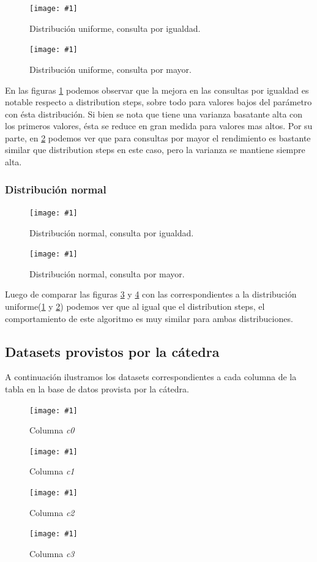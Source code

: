 \documentclass[a4paper, 10pt, twoside]{article}
\newcommand{\grafico}[3]{
  \begin{figure}[H]
    \texttt{[image: \#1]}
    \caption{#2}
    \label{#3}
  \end{figure}
}
\begin{document}
\grafico{plot-custom-uniform-equal}
        {Distribución uniforme, consulta por igualdad.}
        {plot-custom-uniform-equal}
\grafico{plot-custom-uniform-greater}
        {Distribución uniforme, consulta por mayor.}
        {plot-custom-uniform-greater}

En las figuras \ref{plot-custom-uniform-equal} podemos observar que la mejora en las consultas por igualdad es notable respecto a distribution steps, 
sobre todo para valores bajos del parámetro con ésta distribución. Si bien se nota que tiene una varianza basatante alta con los primeros valores, ésta se reduce en gran medida para valores mas altos.
Por su parte, en \ref{plot-custom-uniform-greater} podemos ver que para consultas por mayor el rendimiento es bastante similar que distribution steps en este caso, pero la varianza se mantiene siempre alta.

\subsubsection{Distribución normal}        

\grafico{plot-custom-normal-equal}
        {Distribución normal, consulta por igualdad.}
        {plot-custom-normal-equal}
\grafico{plot-custom-normal-greater}
        {Distribución normal, consulta por mayor.}
        {plot-custom-normal-greater}

Luego de comparar las figuras \ref{plot-custom-normal-equal} y \ref{plot-custom-normal-greater} con las correspondientes a la distribución uniforme(\ref{plot-custom-uniform-equal} y \ref{plot-custom-uniform-greater}) podemos ver que al igual que el distribution steps, el comportamiento de este algoritmo es muy similar para ambas distribuciones.

\subsection{Datasets provistos por la cátedra}

A continuación ilustramos los datasets correspondientes a cada columna de la tabla en la base de datos provista por la cátedra.

\grafico{dataset-c0}
        {Columna \emph{c0}}
        {dataset-columna-c0}

\grafico{dataset-c1}
        {Columna \emph{c1}}
        {dataset-columna-c1}

\grafico{dataset-c2}
        {Columna \emph{c2}}
        {dataset-columna-c2}

\grafico{dataset-c3}
        {Columna \emph{c3}}
        {dataset-columna-c3}
\end{document}

